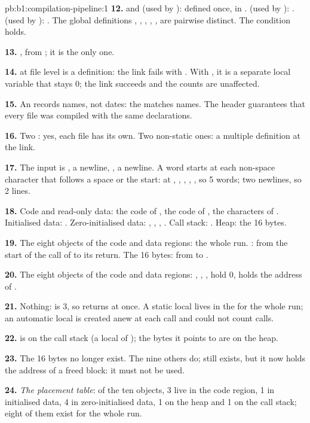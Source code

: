 \begin{solution}{pb:b1:compilation-pipeline:1}
\textbf{12.}  and  (used by ): defined once, in . 
(used by ): .  (used by ): . The global
definitions , , , , ,  are pairwise distinct.
The condition holds.

\textbf{13.} , from ; it is the only one.

\textbf{14.}  at file level is a definition: the link fails with . With , it is a separate local variable that stays 0; the link succeeds and the counts are
unaffected.

\textbf{15.} An  records names, not dates: the  matches names. The header guarantees that every
file was compiled with the same declarations.

\textbf{16.} Two : yes, each file has its own. Two non-static ones: a multiple definition at
the link.

\textbf{17.} The input is , a newline, , a newline. A word starts at each
non-space character that follows a space or the start: at , , , , , so 5
words; two newlines, so 2 lines.

\textbf{18.} Code and read-only data: the code of , the code of , the characters of
. Initialised data: . Zero-initialised data: , , ,
. Call stack: . Heap: the 16 bytes.

\textbf{19.} The eight objects of the code and data regions: the whole run. : from the start of the call
of  to its return. The 16 bytes: from  to .

\textbf{20.} The eight objects of the code and data regions: , , ,
 hold 0,  holds the address of .

\textbf{21.} Nothing:  is 3, so  returns at once. A static local lives in the  for the whole run; an automatic local is created anew at each call and could not count calls.

\textbf{22.}  is on the call stack (a local of ); the bytes it points to are on the heap.

\textbf{23.} The 16 bytes no longer exist. The nine others do;  still exists, but it now holds the
address of a freed block: it must not be used.

\textbf{24.} \emph{The placement table}: of the ten objects, 3 live in the code region, 1 in initialised data, 4 in
zero-initialised data, 1 on the heap and 1 on the call stack; eight of them exist for the whole run.
\end{solution}
